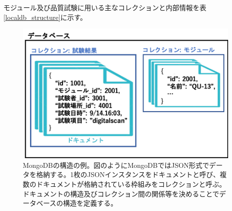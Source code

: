 モジュール及び品質試験に用いる主なコレクションと内部情報を表\ref{localdb_structure}に示す。

\clearpage
\begin{figure}[bpt]\centering
\includegraphics[width=12cm]{mongodb_schema}
\caption[MongoDBの構造の例\cite{4-2}]{MongoDBの構造の例\cite{4-2}。図のようにMongoDBではJSON形式でデータを格納する。1枚のJSONインスタンスをドキュメントと呼び、複数のドキュメントが格納されている枠組みをコレクションと呼ぶ。ドキュメントの構造及びコレクション間の関係等を決めることでデータベースの構造を定義する。}
\label{mongodb_schema}
\end{figure}

